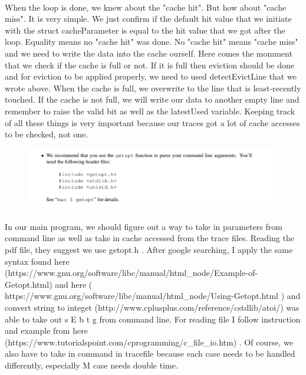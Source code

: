 \documentclass[a4paper]{article}
\begin{document}
\paragraph{} 
When the loop is done, we knew about the "cache hit". But how about "cache miss". It is very simple. We just confirm if the default hit value that we initiate with the struct cacheParameter is equal to the hit value that we got after the loop. Equality means no "cache hit" was done. No "cache hit" means "cache miss" and we need to write the data into the cache ourself. Here comes the momment that we check if the cache is full or not. If it is full then eviction should be done and for eviction to be applied properly, we need to used detectEvictLine that we wrote above. When the cache is full, we overwrite to the line that is least-recently touched. If the cache is not full, we will write our data to another empty line and remember to raise the valid bit as well as the latestUsed variable. Keeping track of all these things is very important because our traces got a lot of cache accesses to be checked, not one. 

\begin{figure}[h!]
  \includegraphics[width=\linewidth]{images/thetruth8.png}
  \caption{}
  \label{}
\end{figure}
\paragraph{} 
In our main program, we should figure out a way to take in parameters from command line as well as take in cache accessed from the trace files. Reading the pdf file, they suggest  we use getopt.h . After google searching, I apply the same syntax found here (https://www.gnu.org/software/libc/manual/html\_node/Example-of-Getopt.html) and here ( https://www.gnu.org/software/libc/manual/html\_node/Using-Getopt.html ) and convert string to integet (http://www.cplusplus.com/reference/cstdlib/atoi/) was able to take out s E b t g from command line. For reading file I follow instruction and example from here (https://www.tutorialspoint.com/cprogramming/c\_file\_io.htm) . Of course, we also have to take in command in tracefile because each case needs to be handled differently, especially M case needs double time.
\end{document}
